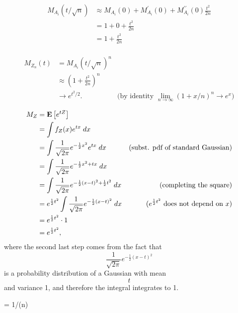 \documentclass[11pt]{article}
\begin{document}
\begin{align*}
    M_{A_i}(t/\sqrt{n}) & \approx M_{A_i}(0) + M_{A_i}^\prime(0) + M_{A_i}^{\prime \prime}(0) \frac{t^2}{2n} \\
                        & = 1 + 0 + \frac{t^2}{2n}                                                           \\
                        & = 1 + \frac{t^2}{2n}                                                               \\
\end{align*}

\begin{align*}
    M_{Z_n}(t) & = M_{A_i}(t/\sqrt{n})^n                                                                                       \\
               & \approx \left( 1 + \frac{t^2}{2n}  \right)^n                                                                  \\
               & \to e^{t^2/2}.                               & \text{(by identity $\lim_{n \to \infty} (1 + x/n)^n \to e^x$)}
\end{align*}

\begin{align*}
    M_{Z} & = \operatorname*{\mathbf{E}} \left[ e^{tZ} \right]                                                                                                \\
          & = \int f_Z(x) e^{tx} \; dx                                                                                                \\
          & = \int \frac{1}{\sqrt{2 \pi}} e^{-\frac{1}{2}x^2} e^{tx} \; dx                 & \text{(subst. pdf of standard Gaussian)} \\
          & = \int \frac{1}{\sqrt{2 \pi}} e^{-\frac{1}{2}x^2 + tx} \; dx                                                              \\
          & = \int \frac{1}{\sqrt{2 \pi}} e^{-\frac{1}{2}(x - t)^2 + \frac{1}{2}t^2} \; dx & \text{(completing the square)}           \\
          & = e^{\frac{1}{2}t^2} \int \frac{1}{\sqrt{2 \pi}} e^{-\frac{1}{2}(x - t)^2 } \; dx & \text{($e^{\frac{1}{2}t^2}$ does not depend on $x$)}           \\
          & = e^{\frac{1}{2}t^2} \cdot  1 \\
          & = e^{\frac{1}{2}t^2},
\end{align*}
where the second last step comes from the fact that
$$\frac{1}{\sqrt{2 \pi}} e^{-\frac{1}{2}(x - t)^2 }$$ is a probability distribution of a Gaussian with mean $$t$$ and variance 1, 
and therefore the integral integrates to 1.

\beta = 1/\poly(n)
\end{document}
